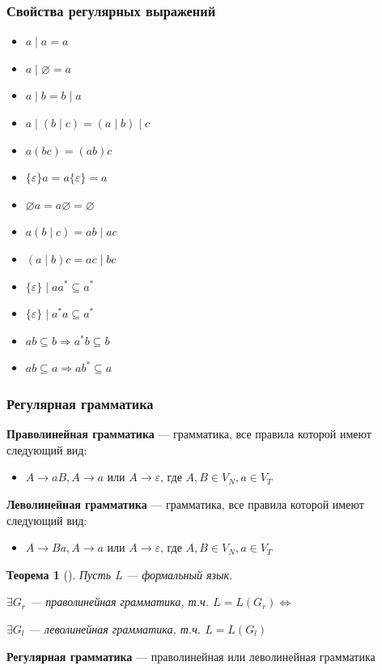 \documentclass{beamer}
\newtheorem{rutheorem}{Теорема}
\begin{document}
\begin{frame}
  \transwipe[direction=90]
  \frametitle{Свойства регулярных выражений}
  \begin{itemize}
    \item $a \mid a = a$
    \item $a \mid \varnothing = a$
    \item $a \mid b = b \mid a$
    \item $a \mid (b \mid c) = (a \mid b) \mid c$
    \item $a(bc) = (ab)c$
    \item $\{\varepsilon \} a = a \{ \varepsilon \} = a $
    \item $\varnothing a = a \varnothing = \varnothing$
    \item $a (b\mid c) = ab \mid ac$
    \item $(a \mid b) c = ac \mid bc $
    \item $\{\varepsilon \} \mid aa^* \subseteq a^*$
    \item $\{\varepsilon \} \mid a^*a \subseteq a^*$
    \item $ab \subseteq b \Rightarrow a^* b \subseteq b$
    \item $ab \subseteq a \Rightarrow a b^* \subseteq a$

  \end{itemize}
\end{frame}



\begin{frame}[fragile]
  \transwipe[direction=90]
  \frametitle{Регулярная грамматика}
  \textbf{Праволинейная грамматика} --- грамматика, все правила которой имеют следующий вид:
  \begin{itemize}
    \item $A \to a B, A \to a \text{ или } A \to \varepsilon \text{, где } A, B \in V_N, a \in V_T$
  \end{itemize}


  \textbf{Леволинейная грамматика} --- грамматика, все правила которой имеют следующий вид:
  \begin{itemize}
    \item $A \to B a, A \to a \text{ или } A \to \varepsilon \text{, где } A, B \in V_N, a \in V_T$
  \end{itemize}

\pause

  \begin{rutheorem}[]
    Пусть L --- формальный язык.

    $\exists G_r$ --- праволинейная грамматика, т.ч. $L = L(G_r) \Leftrightarrow$

    $\exists G_l$ --- леволинейная грамматика, т.ч. $L = L(G_l) $
  \end{rutheorem}
\pause
  \textbf{Регулярная грамматика} --- праволинейная или леволинейная грамматика
\end{frame}
\end{document}
